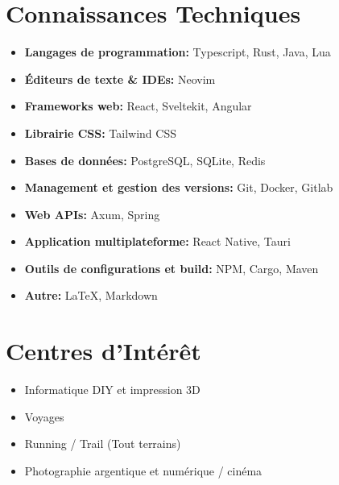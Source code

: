 \documentclass[10pt,a4paper,oneside]{article}
\begin{document}
\begin{multicols}{2}
\section*{Connaissances Techniques}
\begin{itemize}
    \item \textbf{Langages de programmation:} Typescript, Rust, Java, Lua
    \item \textbf{Éditeurs de texte \& IDEs:} Neovim
    \item \textbf{Frameworks web:} React, Sveltekit, Angular
    \item \textbf{Librairie CSS:} Tailwind CSS
    \item \textbf{Bases de données:} PostgreSQL, SQLite, Redis
    \item \textbf{Management et gestion des versions:} Git, Docker, Gitlab
    \item \textbf{Web APIs:} Axum, Spring
    \item \textbf{Application multiplateforme:} React Native, Tauri
    \item \textbf{Outils de configurations et build:} NPM, Cargo, Maven
    \item \textbf{Autre:} LaTeX, Markdown
\end{itemize}

\section*{Centres d’Intérêt}
\begin{itemize}
    \item Informatique DIY et impression 3D
    \item Voyages
    \item Running / Trail (Tout terrains)
    \item Photographie argentique et numérique / cinéma
\end{itemize}

\end{multicols}
\end{document}
